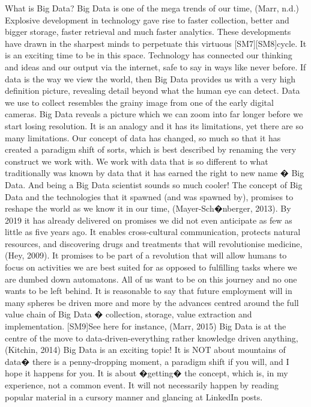 \documentclass{book}
\begin{document}
What is Big Data?
Big Data is one of the mega trends of our time, (Marr, n.d.)
Explosive development in technology gave rise to faster collection, better and bigger storage, faster retrieval and much faster analytics.  These developments have drawn in the sharpest minds to perpetuate this virtuous [SM7][SM8]cycle.  It is an exciting time to be in this space.  Technology has connected our thinking and ideas and our output via the internet, safe to say in ways like never before.
If data is the way we view the world, then Big Data provides us with a very high definition picture, revealing detail beyond what the human eye can detect.   Data we use to collect resembles the grainy image from one of the early digital cameras.  Big Data reveals a picture which we can zoom into far longer before we start losing resolution.  It is an analogy and it has its limitations, yet there are so many limitations. 
Our concept of data has changed, so much so that it has created a paradigm shift of sorts, which is best described by renaming the very construct we work with.  We work with data that is so different to what traditionally was known by data that it has earned the right to new name � Big Data.  And being a Big Data scientist sounds so much cooler!
The concept of Big Data and the technologies that it spawned (and was spawned by), promises to reshape the world as we know it in our time, (Mayer-Sch�nberger, 2013). By 2019 it has already delivered on promises we did not even anticipate as few as little as five years ago.  It enables cross-cultural communication, protects natural resources, and discovering drugs and treatments that will revolutionise medicine,  (Hey, 2009). It promises to be part of a revolution that will allow humans to focus on activities we are best suited for as opposed to fulfilling tasks where we are dumbed down automatons.   All of us want to be on this journey and no one wants to be left behind.  It is reasonable to say that future employment will in many spheres be driven more and more by the advances centred around the full value chain of Big Data � collection, storage, value extraction and implementation. [SM9]See here for instance, (Marr, 2015)   Big Data is at the centre of the move to data-driven-everything rather knowledge driven anything, (Kitchin, 2014)
Big Data is an exciting topic!  It is NOT about mountains of data�  there is a penny-dropping moment, a paradigm shift if you will, and I hope it happens for you.  It is about �getting� the concept, which is, in my experience, not a common event.  It will not necessarily happen by reading popular material in a cursory manner and glancing at LinkedIn posts. 
\end{document}
